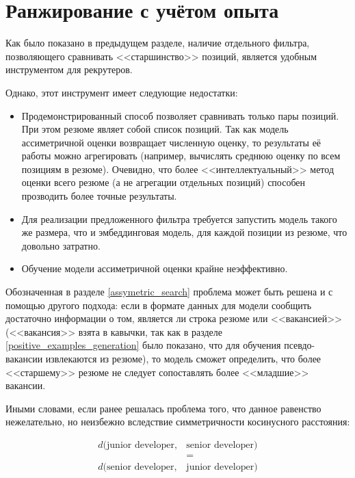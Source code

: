 \documentclass[14pt]{mmcs_article}
\begin{document}
\newpage
\section{Ранжирование с учётом опыта}\label{experience_ranking}

Как было показано в предыдущем разделе, наличие отдельного фильтра, позволяющего сравнивать <<старшинство>> позиций, является удобным инструментом для рекрутеров.

Однако, этот инструмент имеет следующие недостатки:

\begin{itemize}
  \item Продемонстрированный способ позволяет сравнивать только пары позиций. При этом резюме являет собой список позиций. Так как модель ассиметричной оценки возвращает численную оценку, то результаты её работы можно агрегировать (например, вычислять среднюю оценку по всем позициям в резюме). Очевидно, что более <<интеллектуальный>> метод оценки всего резюме (а не агрегации отдельных позиций) способен прозводить более точные результаты.
  \item Для реализации предложенного фильтра требуется запустить модель такого же размера, что и эмбеддинговая модель, для каждой позиции из резюме, что довольно затратно.
  \item Обучение модели ассиметричной оценки крайне неэффективно.
\end{itemize}

Обозначенная в разделе \ref{assymetric_search} проблема может быть решена и с помощью другого подхода: если в формате данных для модели сообщить достаточно информации о том, является ли строка резюме или <<вакансией>> (<<вакансия>> взята в кавычки, так как в разделе \ref{positive_examples_generation} было показано, что для обучения псевдо-вакансии извлекаются из резюме), то модель сможет определить, что более <<старшему>> резюме не следует сопоставлять более <<младшие>> вакансии.

Иными словами, если ранее решалась проблема того, что данное равенство нежелательно, но неизбежно вследствие симметричности косинусного расстояния:

\begin{equation}
  \label{eq:assymetric_search_problem}
  \begin{aligned}
    d(\text{junior developer}, & \text{senior developer}) \\
                               & =                        \\
    d(\text{senior developer}, & \text{junior developer})
  \end{aligned}
\end{equation}
\end{document}
